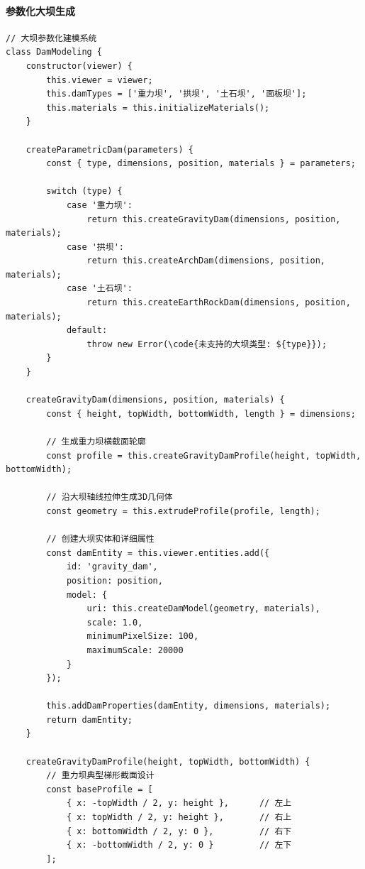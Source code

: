 \hypertarget{ux53c2ux6570ux5316ux5927ux575dux751fux6210}{%
\paragraph{参数化大坝生成}\label{ux53c2ux6570ux5316ux5927ux575dux751fux6210}}

\begin{lstlisting}[style=javascript]
// 大坝参数化建模系统
class DamModeling {
    constructor(viewer) {
        this.viewer = viewer;
        this.damTypes = ['重力坝', '拱坝', '土石坝', '面板坝'];
        this.materials = this.initializeMaterials();
    }
    
    createParametricDam(parameters) {
        const { type, dimensions, position, materials } = parameters;
        
        switch (type) {
            case '重力坝':
                return this.createGravityDam(dimensions, position, materials);
            case '拱坝':
                return this.createArchDam(dimensions, position, materials);
            case '土石坝':
                return this.createEarthRockDam(dimensions, position, materials);
            default:
                throw new Error(\code{未支持的大坝类型: ${type}});
        }
    }
    
    createGravityDam(dimensions, position, materials) {
        const { height, topWidth, bottomWidth, length } = dimensions;
        
        // 生成重力坝横截面轮廓
        const profile = this.createGravityDamProfile(height, topWidth, bottomWidth);
        
        // 沿大坝轴线拉伸生成3D几何体
        const geometry = this.extrudeProfile(profile, length);
        
        // 创建大坝实体和详细属性
        const damEntity = this.viewer.entities.add({
            id: 'gravity_dam',
            position: position,
            model: {
                uri: this.createDamModel(geometry, materials),
                scale: 1.0,
                minimumPixelSize: 100,
                maximumScale: 20000
            }
        });
        
        this.addDamProperties(damEntity, dimensions, materials);
        return damEntity;
    }
    
    createGravityDamProfile(height, topWidth, bottomWidth) {
        // 重力坝典型梯形截面设计
        const baseProfile = [
            { x: -topWidth / 2, y: height },      // 左上
            { x: topWidth / 2, y: height },       // 右上  
            { x: bottomWidth / 2, y: 0 },         // 右下
            { x: -bottomWidth / 2, y: 0 }         // 左下
        ];
        

\end{lstlisting}
